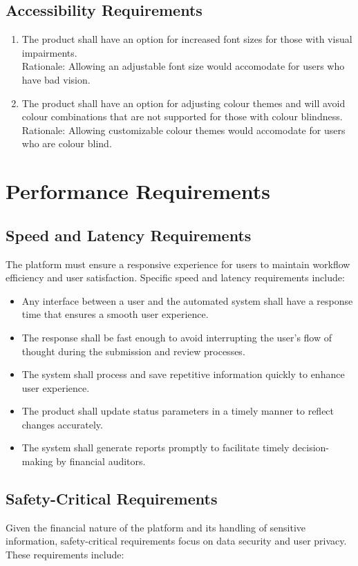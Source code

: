 \documentclass[12pt]{article}
\begin{document}
\subsection{Accessibility Requirements}

\begin{enumerate}
  
  \item The product shall have an option for increased font sizes for those with visual impairments. \\
  Rationale: Allowing an adjustable font size would accomodate for users who have bad vision.
  \item The product shall have an option for adjusting colour themes and will avoid colour combinations that are not supported for those with colour blindness. \\
  Rationale: Allowing customizable colour themes would accomodate for users who are colour blind.
\end{enumerate}
\section{Performance Requirements}

\subsection{Speed and Latency Requirements}
The platform must ensure a responsive experience for users to maintain workflow efficiency and user satisfaction. Specific speed and latency requirements include:

\begin{itemize}
    \item Any interface between a user and the automated system shall have a response time that ensures a smooth user experience.
    \item The response shall be fast enough to avoid interrupting the user’s flow of thought during the submission and review processes.
    \item The system shall process and save repetitive information quickly to enhance user experience.
    \item The product shall update status parameters in a timely manner to reflect changes accurately.
    \item The system shall generate reports promptly to facilitate timely decision-making by financial auditors.
\end{itemize}

\subsection{Safety-Critical Requirements}
Given the financial nature of the platform and its handling of sensitive information, safety-critical requirements focus on data security and user privacy. These requirements include:
\end{document}
